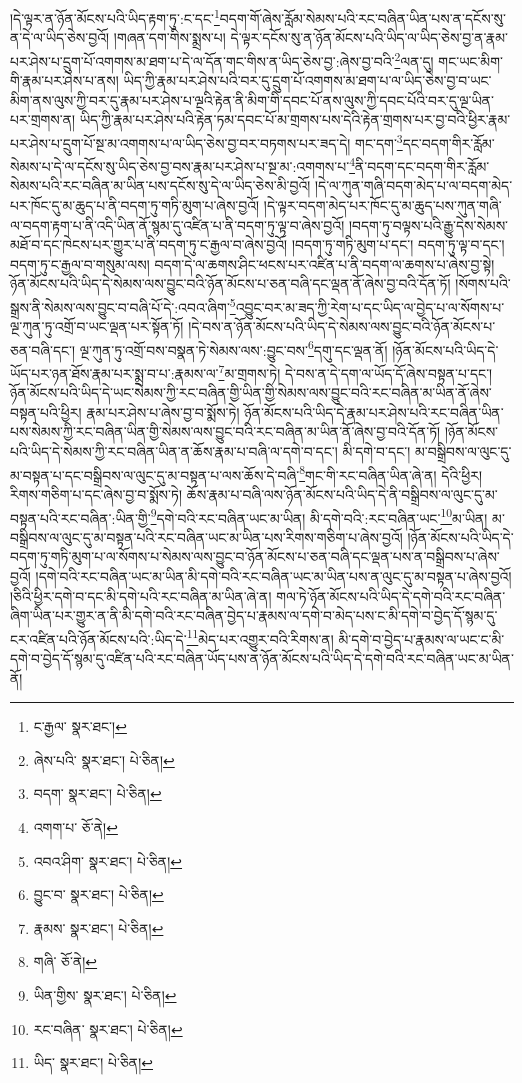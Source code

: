།དེ་ལྟར་ན་ཉོན་མོངས་པའི་ཡིད་རྟག་ཏུ་:ང་དང་\footnote{ང་རྒྱལ་  སྣར་ཐང་། }བདག་གོ་ཞེས་རློམ་སེམས་པའི་རང་བཞིན་ཡིན་པས་ན་དངོས་སུ་ན་དེ་ལ་ཡིད་ཅེས་བྱའོ། །གཞན་དག་གིས་སྨྲས་པ། དེ་ལྟར་དངོས་སུ་ན་ཉོན་མོངས་པའི་ཡིད་ལ་ཡིད་ཅེས་བྱ་ན་རྣམ་པར་ཤེས་པ་དྲུག་པོ་འགགས་མ་ཐག་པ་དེ་ལ་དོན་གང་གིས་ན་ཡིད་ཅེས་བྱ་:ཞེས་བྱ་བའི་\footnote{ཞེས་པའི་  སྣར་ཐང་།  པེ་ཅིན། }ལན་དུ། གང་ཡང་མིག་གི་རྣམ་པར་ཤེས་པ་ནས། ཡིད་ཀྱི་རྣམ་པར་ཤེས་པའི་བར་དུ་དྲུག་པོ་འགགས་མ་ཐག་པ་ལ་ཡིད་ཅེས་བྱ་བ་ཡང་མིག་ནས་ལུས་ཀྱི་བར་དུ་རྣམ་པར་ཤེས་པ་ལྔའི་རྟེན་ནི་མིག་གི་དབང་པོ་ནས་ལུས་ཀྱི་དབང་པོའི་བར་དུ་ལྔ་ཡིན་པར་གྲགས་ན། ཡིད་ཀྱི་རྣམ་པར་ཤེས་པའི་རྟེན་ཏམ་དབང་པོ་མ་གྲགས་པས་དེའི་རྟེན་གྲགས་པར་བྱ་བའི་ཕྱིར་རྣམ་པར་ཤེས་པ་དྲུག་པོ་སྔ་མ་འགགས་པ་ལ་ཡིད་ཅེས་བྱ་བར་བཏགས་པར་ཟད་དེ། གང་དག་\footnote{བདག་  སྣར་ཐང་།  པེ་ཅིན། }དང་བདག་གིར་རློམ་སེམས་པ་དེ་ལ་དངོས་སུ་ཡིད་ཅེས་བྱ་བས་རྣམ་པར་ཤེས་པ་སྔ་མ་:འགགས་པ་\footnote{འགག་པ་  ཅོ་ནེ། }ནི་བདག་དང་བདག་གིར་རློམ་སེམས་པའི་རང་བཞིན་མ་ཡིན་པས་དངོས་སུ་དེ་ལ་ཡིད་ཅེས་མི་བྱའོ། །དེ་ལ་ཀུན་གཞི་བདག་མེད་པ་ལ་བདག་མེད་པར་ཁོང་དུ་མ་ཆུད་པ་ནི་བདག་ཏུ་གཏི་མུག་པ་ཞེས་བྱའོ། །དེ་ལྟར་བདག་མེད་པར་ཁོང་དུ་མ་ཆུད་པས་ཀུན་གཞི་ལ་བདག་རྟག་པ་ནི་འདི་ཡིན་ནོ་སྙམ་དུ་འཛིན་པ་ནི་བདག་ཏུ་ལྟ་བ་ཞེས་བྱའོ། །བདག་ཏུ་བལྟས་པའི་རྒྱུ་དེས་སེམས་མཐོ་བ་དང་ཁེངས་པར་གྱུར་པ་ནི་བདག་ཏུ་ང་རྒྱལ་བ་ཞེས་བྱའོ། །བདག་ཏུ་གཏི་མུག་པ་དང་། བདག་ཏུ་ལྟ་བ་དང་། བདག་ཏུ་ང་རྒྱལ་བ་གསུམ་ལས། བདག་དེ་ལ་ཆགས་ཤིང་ཕངས་པར་འཛིན་པ་ནི་བདག་ལ་ཆགས་པ་ཞེས་བྱ་སྟེ། ཉོན་མོངས་པའི་ཡིད་དེ་སེམས་ལས་བྱུང་བའི་ཉོན་མོངས་པ་ཅན་བཞི་དང་ལྡན་ནོ་ཞེས་བྱ་བའི་དོན་ཏོ། །སོགས་པའི་སྒྲས་ནི་སེམས་ལས་བྱུང་བ་བཞི་པོ་དེ་:འབའ་ཞིག་\footnote{འབའ་ཤིག་  སྣར་ཐང་།  པེ་ཅིན། }འབྱུང་བར་མ་ཟད་ཀྱི་རེག་པ་དང་ཡིད་ལ་བྱེད་པ་ལ་སོགས་པ་ལྔ་ཀུན་ཏུ་འགྲོ་བ་ཡང་ལྡན་པར་སྟོན་ཏོ། །དེ་བས་ན་ཉོན་མོངས་པའི་ཡིད་དེ་སེམས་ལས་བྱུང་བའི་ཉོན་མོངས་པ་ཅན་བཞི་དང་། ལྔ་ཀུན་ཏུ་འགྲོ་བས་བསྣན་ཏེ་སེམས་ལས་:བྱུང་བས་\footnote{བྱུང་བ་  སྣར་ཐང་།  པེ་ཅིན། }དགུ་དང་ལྡན་ནོ། །ཉོན་མོངས་པའི་ཡིད་དེ་ཡོད་པར་ཉན་ཐོས་རྣམ་པར་སྨྲ་བ་པ་:རྣམས་ལ་\footnote{རྣམས་  སྣར་ཐང་།  པེ་ཅིན། }མ་གྲགས་ཏེ། དེ་བས་ན་དེ་དག་ལ་ཡོད་དོ་ཞེས་བསྟན་པ་དང་། ཉོན་མོངས་པའི་ཡིད་དེ་ཡང་སེམས་ཀྱི་རང་བཞིན་གྱི་ཡིན་གྱི་སེམས་ལས་བྱུང་བའི་རང་བཞིན་མ་ཡིན་ནོ་ཞེས་བསྟན་པའི་ཕྱིར། རྣམ་པར་ཤེས་པ་ཞེས་བྱ་བ་སྨོས་ཏེ། ཉོན་མོངས་པའི་ཡིད་དེ་རྣམ་པར་ཤེས་པའི་རང་བཞིན་ཡིན་པས་སེམས་ཀྱི་རང་བཞིན་ཡིན་གྱི་སེམས་ལས་བྱུང་བའི་རང་བཞིན་མ་ཡིན་ནོ་ཞེས་བྱ་བའི་དོན་ཏོ། །ཉོན་མོངས་པའི་ཡིད་དེ་སེམས་ཀྱི་རང་བཞིན་ཡིན་ན་ཆོས་རྣམ་པ་བཞི་ལ་དགེ་བ་དང་། མི་དགེ་བ་དང་། མ་བསྒྲིབས་ལ་ལུང་དུ་མ་བསྟན་པ་དང་བསྒྲིབས་ལ་ལུང་དུ་མ་བསྟན་པ་ལས་ཆོས་དེ་བཞི་\footnote{གཞི་  ཅོ་ནེ། }གང་གི་རང་བཞིན་ཡིན་ཞེ་ན། དེའི་ཕྱིར། རིགས་གཅིག་པ་དང་ཞེས་བྱ་བ་སྨོས་ཏེ། ཆོས་རྣམ་པ་བཞི་ལས་ཉོན་མོངས་པའི་ཡིད་དེ་ནི་བསྒྲིབས་ལ་ལུང་དུ་མ་བསྟན་པའི་རང་བཞིན་:ཡིན་གྱི་\footnote{ཡིན་གྱིས་  སྣར་ཐང་།  པེ་ཅིན། }དགེ་བའི་རང་བཞིན་ཡང་མ་ཡིན། མི་དགེ་བའི་:རང་བཞིན་ཡང་\footnote{རང་བཞིན་  སྣར་ཐང་།  པེ་ཅིན། }མ་ཡིན། མ་བསྒྲིབས་ལ་ལུང་དུ་མ་བསྟན་པའི་རང་བཞིན་ཡང་མ་ཡིན་པས་རིགས་གཅིག་པ་ཞེས་བྱའོ། །ཉོན་མོངས་པའི་ཡིད་དེ་བདག་ཏུ་གཏི་མུག་པ་ལ་སོགས་པ་སེམས་ལས་བྱུང་བ་ཉོན་མོངས་པ་ཅན་བཞི་དང་ལྡན་པས་ན་བསྒྲིབས་པ་ཞེས་བྱའོ། །དགེ་བའི་རང་བཞིན་ཡང་མ་ཡིན་མི་དགེ་བའི་རང་བཞིན་ཡང་མ་ཡིན་པས་ན་ལུང་དུ་མ་བསྟན་པ་ཞེས་བྱའོ། །ཅིའི་ཕྱིར་དགེ་བ་དང་མི་དགེ་པའི་རང་བཞིན་མ་ཡིན་ཞེ་ན། གལ་ཏེ་ཉོན་མོངས་པའི་ཡིད་དེ་དགེ་བའི་རང་བཞིན་ཞིག་ཡིན་པར་གྱུར་ན་ནི་མི་དགེ་བའི་རང་བཞིན་བྱེད་པ་རྣམས་ལ་དགེ་བ་མེད་པས་ང་མི་དགེ་བ་བྱེད་དོ་སྙམ་དུ་ངར་འཛིན་པའི་ཉོན་མོངས་པའི་:ཡིད་དེ་\footnote{ཡིད་  སྣར་ཐང་།  པེ་ཅིན། }མེད་པར་འགྱུར་བའི་རིགས་ན། མི་དགེ་བ་བྱེད་པ་རྣམས་ལ་ཡང་ང་མི་དགེ་བ་བྱེད་དོ་སྙམ་དུ་འཛིན་པའི་རང་བཞིན་ཡོད་པས་ན་ཉོན་མོངས་པའི་ཡིད་དེ་དགེ་བའི་རང་བཞིན་ཡང་མ་ཡིན་ནོ། 